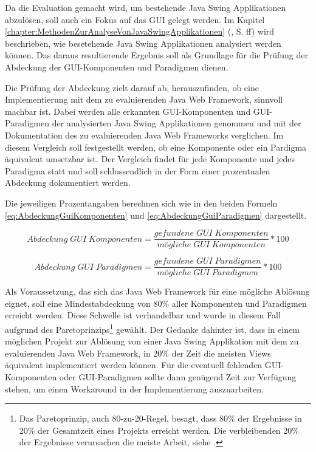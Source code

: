   Da die Evaluation gemacht wird, um bestehende Java Swing Applikationen
  abzulösen, soll auch ein Fokus auf das \ac{GUI} gelegt werden. Im Kapitel
  \ref{chapter:MethodenZurAnalyseVonJavaSwingApplikationen}
  (, S.
  \pageref{chapter:MethodenZurAnalyseVonJavaSwingApplikationen}ff) wird
  beschrieben, wie besetehende Java Swing Applikationen analysiert werden
  können. Das daraus resultierende Ergebnis soll als Grundlage für die Prüfung
  der Abdeckung der GUI-Komponenten und Paradigmen dienen.
  
  Die Prüfung der Abdeckung zielt darauf ab, herauszufinden, ob eine
  Implementierung mit dem zu evaluierenden Java Web Framework, sinnvoll machbar
  ist. Dabei werden alle erkannten GUI-Komponenten und GUI-Paradigmen der
  analysierten Java Swing Applikationen genommen und mit der Dokumentation des
  zu evaluierenden Java Web Frameworks verglichen. Im diesem Vergleich soll
  festgestellt werden, ob eine Komponente oder ein Pardigma äquivalent
  umsetzbar ist. Der Vergleich findet für jede Komponente und jedes
  Paradigma statt und soll schlussendlich in der Form einer prozentualen
  Abdeckung dokumentiert werden.
  
  Die jeweiligen Prozentangaben berechnen sich wie in den beiden Formeln
  \ref{eq:AbdeckungGuiKomponenten} und \ref{eq:AbdeckungGuiParadigmen}
  dargestellt.

  \begin{equation}
    \label{eq:AbdeckungGuiKomponenten}
    Abdeckung\;GUI\;Komponenten = \frac
    	{gefundene\;GUI\;Komponenten}
    	{mögliche\;GUI\;Komponenten} * 100
  \end{equation}

  \begin{equation}
    \label{eq:AbdeckungGuiParadigmen}
    Abdeckung\;GUI\;Paradigmen = \frac
    	{gefundene\;GUI\;Paradigmen}
    	{mögliche\;GUI\;Paradigmen} * 100
  \end{equation}
  
  Als Voraussetzung, das sich das Java Web Framework für eine mögliche Ablösung
  eignet, soll eine Mindestabdeckung von 80\% aller Komponenten und
  Paradigmen erreicht werden. Diese Schwelle ist verhandelbar und wurde in
  diesem Fall aufgrund des Paretoprinzips\footnote{Das Paretoprinzip, auch
  80-zu-20-Regel, besagt, dass 80\% der Ergebnisse in 20\% der Gesamtzeit eines
  Projekts erreicht werden. Die verbleibenden 20\% der Ergebnisse verursachen
  die meiste Arbeit, siehe \cite{Paretoprinzip}.} gewählt. Der Gedanke dahinter
  ist, dass in einem möglichen Projekt zur Ablösung von einer Java Swing
  Applikation mit dem zu evaluierenden Java Web Framework, in 20\% der Zeit die
  meisten Views äquivalent implementiert werden können. Für die eventuell
  fehlenden GUI-Komponenten oder GUI-Paradigmen sollte dann genügend Zeit zur
  Verfügung stehen, um einen Workaround in der Implementierung auszuarbeiten.
  
